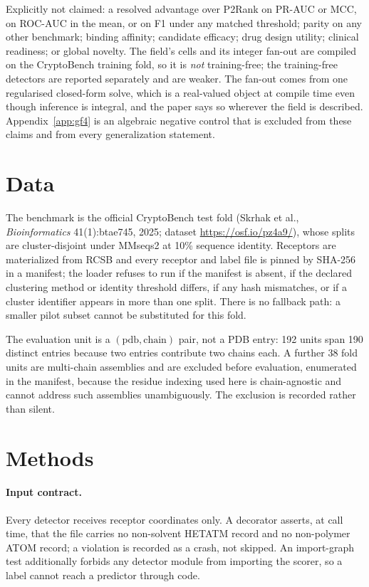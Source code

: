 \documentclass[11pt]{article}
\begin{document}
Explicitly not claimed: a resolved advantage over P2Rank on PR-AUC or MCC, on
ROC-AUC in the mean, or on F1 under any matched threshold; parity on any other
benchmark; binding affinity; candidate efficacy; drug
design utility; clinical readiness; or global novelty. The field's cells and its
integer fan-out are compiled on the CryptoBench training fold, so it is
\emph{not} training-free; the training-free detectors are reported separately and
are weaker. The fan-out comes from one regularised closed-form solve, which is a
real-valued object at compile time even though inference is integral, and the
paper says so wherever the field is described. Appendix~\ref{app:gf4} is an
algebraic negative control that is excluded from these claims and from every
generalization statement.

\section{Data}
The benchmark is the official CryptoBench test fold (Skrhak et al.,
\emph{Bioinformatics} 41(1):btae745, 2025; dataset \url{https://osf.io/pz4a9/}),
whose splits are cluster-disjoint under MMseqs2 at 10\% sequence identity.
Receptors are materialized from RCSB and every receptor and label file is pinned
by SHA-256 in a manifest; the loader refuses to run if the manifest is absent,
if the declared clustering method or identity threshold differs, if any hash
mismatches, or if a cluster identifier appears in more than one split. There is
no fallback path: a smaller pilot subset cannot be substituted for this fold.

The evaluation unit is a \((\text{pdb},\text{chain})\) pair, not a PDB entry:
192 units span 190 distinct entries because two entries contribute two chains
each. A further 38 fold units are multi-chain assemblies and are excluded before
evaluation, enumerated in the manifest, because the residue indexing used here is
chain-agnostic and cannot address such assemblies unambiguously. The exclusion is
recorded rather than silent.

\section{Methods}
\label{sec:methods}
\paragraph{Input contract.} Every detector receives receptor coordinates only.
A decorator asserts, at call time, that the file carries no non-solvent HETATM
record and no non-polymer ATOM record; a violation is recorded as a crash, not
skipped. An import-graph test additionally forbids any detector module from
importing the scorer, so a label cannot reach a predictor through code.
\end{document}
